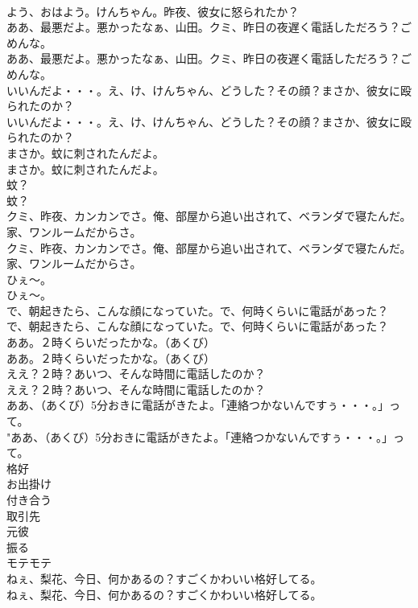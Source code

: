 \documentclass[8pt]{extreport}
\begin{document}
\begin{CJK}{UTF8}{min}
\\	よう、おはよう。けんちゃん。昨夜、彼女に怒られたか？ 
\\	ああ、最悪だよ。悪かったなぁ、山田。クミ、昨日の夜遅く電話しただろう？ごめんな。	
\\	ああ、最悪だよ。悪かったなぁ、山田。クミ、昨日の夜遅く電話しただろう？ごめんな。 
\\	いいんだよ・・・。え、け、けんちゃん、どうした？その顔？まさか、彼女に殴られたのか？	
\\	いいんだよ・・・。え、け、けんちゃん、どうした？その顔？まさか、彼女に殴られたのか？ 
\\	まさか。蚊に刺されたんだよ。	
\\	まさか。蚊に刺されたんだよ。 
\\	蚊？	
\\	蚊？ 
\\	クミ、昨夜、カンカンでさ。俺、部屋から追い出されて、ベランダで寝たんだ。家、ワンルームだからさ。	
\\	クミ、昨夜、カンカンでさ。俺、部屋から追い出されて、ベランダで寝たんだ。家、ワンルームだからさ。 
\\	ひぇ～。	
\\	ひぇ～。 
\\	で、朝起きたら、こんな顔になっていた。で、何時くらいに電話があった？	
\\	で、朝起きたら、こんな顔になっていた。で、何時くらいに電話があった？ 
\\	ああ。２時くらいだったかな。（あくび）	
\\	ああ。２時くらいだったかな。（あくび） 
\\	ええ？２時？あいつ、そんな時間に電話したのか？	
\\	ええ？２時？あいつ、そんな時間に電話したのか？ 
\\	ああ、（あくび）5分おきに電話がきたよ。「連絡つかないんですぅ・・・。」って。	
\\	"ああ、（あくび）5分おきに電話がきたよ。「連絡つかないんですぅ・・・。」って。 
\\	格好
\\	お出掛け
\\	付き合う
\\	取引先
\\	元彼
\\	振る
\\	モテモテ
\\	ねぇ、梨花、今日、何かあるの？すごくかわいい格好してる。	
\\	ねぇ、梨花、今日、何かあるの？すごくかわいい格好してる。 

\end{CJK}
\end{document}
